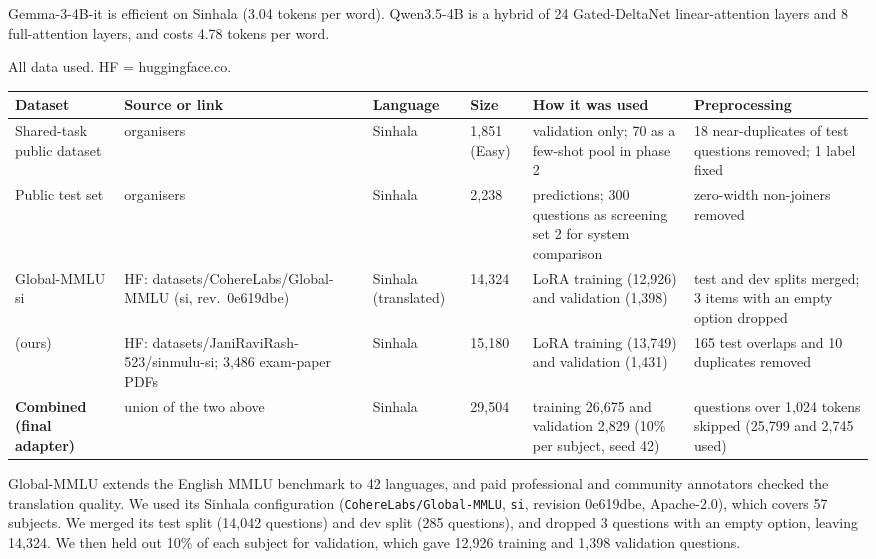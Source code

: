 Gemma-3-4B-it is efficient on Sinhala (3.04 tokens per word). Qwen3.5-4B is a hybrid of 24 Gated-DeltaNet linear-attention layers and 8 full-attention layers, and costs 4.78 tokens per word.

\clearpage
\begin{center}\captionsetup{type=table}
\small
\caption{All data used. HF = huggingface.co.}\label{tab:data}
\begin{tabularx}{\textwidth}{@{}L{0.16\textwidth}L{0.26\textwidth}L{0.08\textwidth}L{0.07\textwidth}YL{0.2\textwidth}@{}}
\toprule
Dataset & Source or link & Language & Size & How it was used & Preprocessing \\
\midrule
Shared-task public dataset & organisers & Sinhala & 1,851 (Easy) & validation only; 70 as a few-shot pool in phase 2 & 18 near-duplicates of test questions removed; 1 label fixed \\
Public test set & organisers & Sinhala & 2,238 & predictions; 300 questions as screening set 2 for system comparison & zero-width non-joiners removed \\
Global-MMLU si \citep{singh2025globalmmlu} & HF: datasets/CohereLabs/Global-MMLU (si, rev.\ 0e619dbe) & Sinhala (translated) & 14,324 & LoRA training (12,926) and validation (1,398) & test and dev splits merged; 3 items with an empty option dropped \\
\sinmulu{} (ours) & HF: datasets/JaniRaviRash-523/sinmulu-si; 3,486 exam-paper PDFs & Sinhala & 15,180 & LoRA training (13,749) and validation (1,431) & 165 test overlaps and 10 duplicates removed \\
\textbf{Combined (final adapter)} & union of the two above & Sinhala & 29,504 & training 26,675 and validation 2,829 (10\% per subject, seed 42) & questions over 1,024 tokens skipped (25,799 and 2,745 used) \\
\bottomrule
\end{tabularx}
\end{center}

 Global-MMLU \citep{singh2025globalmmlu} extends the English MMLU benchmark to 42 languages, and paid professional and community annotators checked the translation quality. We used its Sinhala configuration (\texttt{CohereLabs/Global-MMLU}, \texttt{si}, revision 0e619dbe, Apache-2.0), which covers 57 subjects. We merged its test split (14,042 questions) and dev split (285 questions), and dropped 3 questions with an empty option, leaving 14,324. We then held out 10\% of each subject for validation, which gave 12,926 training and 1,398 validation questions.

